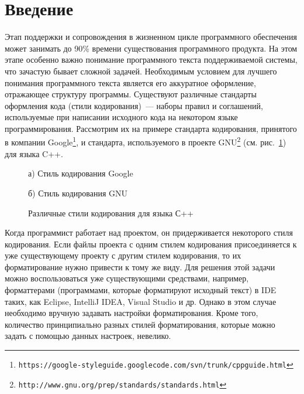 \section*{Введение}

Этап поддержки и сопровождения в жизненном цикле программного обеспечения может занимать до 90\% времени существования программного продукта. На этом этапе особенно важно понимание программного текста поддерживаемой системы, что зачастую бывает сложной задачей. Необходимым условием для лучшего понимания программного текста является его аккуратное оформление, отражающее структуру 
программы. Существуют различные стандарты оформления кода (стили кодирования)~--- наборы правил и соглашений, используемые при написании исходного кода на некотором языке программирования.
Рассмотрим их на примере стандарта кодирования, принятого в компании Google\footnote{\texttt{https://google-styleguide.googlecode.com/svn/trunk/cppguide.html}}, и стандарта, используемого в проекте GNU\footnote{\texttt{http://www.gnu.org/prep/standards/standards.html}} (см. рис.~\ref{codingstandards}) для языка C++.


\begin{figure}[ht]
\noindent\begin{minipage}{.5\textwidth}
    
\caption*{а) Стиль кодирования Google}    
\end{minipage}\hfill
\begin{minipage}{.5\textwidth}
    
\caption*{б) Стиль кодирования GNU}    
\end{minipage}
\caption{Различные стили кодирования для языка С++}    
\label{codingstandards}
\end{figure}

Когда программист работает над проектом, он придерживается некоторого стиля кодирования. 
Если файлы проекта с одним стилем кодирования присоединяется к уже существующему проекту с другим стилем кодирования, то их форматирование нужно привести к тому же виду. 
Для решения этой задачи можно воспользоваться уже существующими средствами, например, форматтерами (программами, которые форматируют исходный текст) в IDE таких, как Eclipse, IntelliJ IDEA, Visual Studio и др. 
Однако в этом случае необходимо вручную задавать настройки форматирования.
Кроме того, количество принципиально разных стилей форматирования, которые можно задать с помощью данных настроек, невелико.

